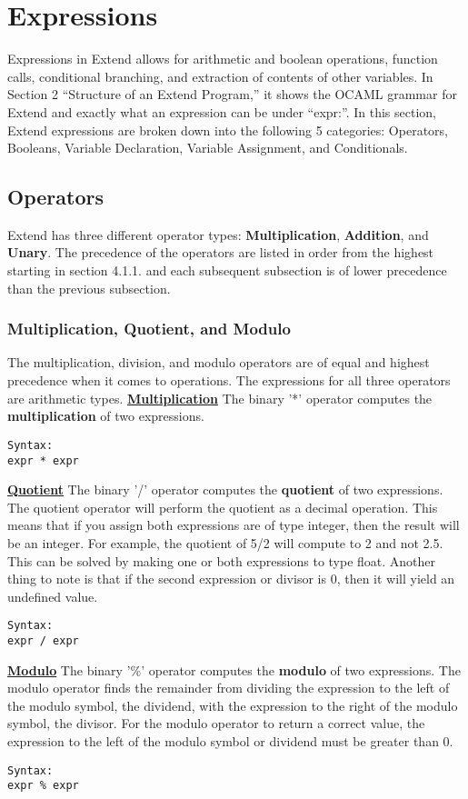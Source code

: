 \section{Expressions}
	Expressions in Extend allows for arithmetic and boolean operations, function calls, conditional branching, and extraction of contents of other variables. In Section 2 “Structure of an Extend Program,” it shows the OCAML grammar for Extend and exactly what an expression can be under “expr:”. In this section, Extend expressions are broken down into the following 5 categories: Operators, Booleans, Variable Declaration, Variable Assignment, and Conditionals.


	\subsection{Operators}
		Extend has three different operator types: \textbf{Multiplication}, \textbf{Addition}, and \textbf{Unary}. The precedence of the operators are listed in order from the highest starting in section 4.1.1. and each subsequent subsection is of lower precedence than the previous subsection. 
		\newline

		\subsubsection{Multiplication, Quotient, and Modulo}
			The multiplication, division, and modulo operators are of equal and highest precedence when it comes to operations. The expressions for all three operators are arithmetic types.
			\newline
			\underline{\textbf{Multiplication}}\newline
			The binary '*' operator computes the \textbf{multiplication} of two expressions.
			\begin{lstlisting}
Syntax:
expr * expr 
			\end{lstlisting}
			\underline{\textbf{Quotient}}\newline
			The binary '/' operator computes the \textbf{quotient} of two expressions. The quotient operator will perform the quotient as a decimal operation. This means that if you assign both expressions are of type integer, then the result will be an integer. For example, the quotient of 5/2 will compute to 2 and not 2.5. This can be solved by making one or both expressions to type float. Another thing to note is that if the second expression or divisor is 0, then it will yield an undefined value.
			\begin{lstlisting}
Syntax:
expr / expr 
			\end{lstlisting}
			\underline{\textbf{Modulo}}\newline
			The binary '\%' operator computes the \textbf{modulo} of two expressions. The modulo operator finds the remainder from dividing the expression to the left of the modulo symbol, the dividend, with the expression to the right of the modulo symbol, the divisor. For the modulo operator to return a correct value, the expression to the left of the modulo symbol or dividend must be greater than 0.
			\begin{lstlisting}
Syntax:
expr % expr 
			\end{lstlisting}
